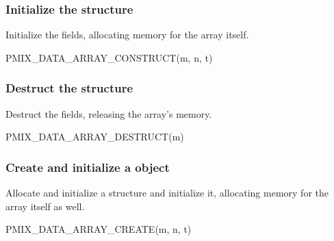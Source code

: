 \subsubsection{Initialize the  structure}

Initialize the  fields, allocating memory for the array itself.

\cspecificstart
\begin{codepar}
PMIX_DATA_ARRAY_CONSTRUCT(m, n, t)
\end{codepar}
\cspecificend

\begin{arglist}
\end{arglist}

\subsubsection{Destruct the  structure}

Destruct the  fields, releasing the array's memory.

\cspecificstart
\begin{codepar}
PMIX_DATA_ARRAY_DESTRUCT(m)
\end{codepar}
\cspecificend

\begin{arglist}
\end{arglist}

\subsubsection{Create and initialize a  object}

Allocate and initialize a  structure and initialize it, allocating memory for the array itself as well.

\cspecificstart
\begin{codepar}
PMIX_DATA_ARRAY_CREATE(m, n, t)
\end{codepar}
\cspecificend


